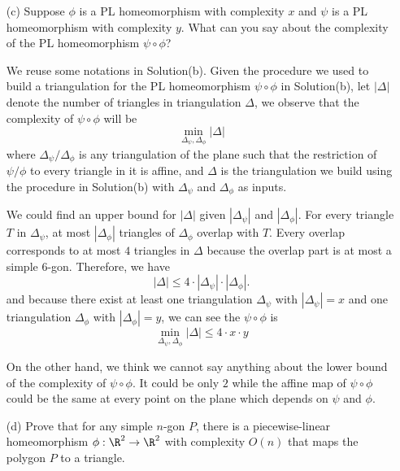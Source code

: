 \documentclass[11pt]{article}
\begin{document}
\begin{enumerate}[(a)]
\begin{solution}
\end{solution}

  \item[(c)]
    Suppose \(\phi\) is a PL homeomorphism with complexity \(x\) and \(\psi\) is a PL
    homeomorphism with complexity \(y\).
    What can you say about the complexity of the PL homeomorphism \(\psi \circ \phi\)?

\begin{solution}
  We reuse some notations in Solution(b).
  Given the procedure we used to build a triangulation for the PL homeomorphism \(\psi\circ \phi\) in Solution(b), let \(|\Delta|\) denote the number of triangles in triangulation \(\Delta\), we observe that the complexity of \(\psi\circ \phi\) will be 
  \[\min_{\Delta_{\psi},\Delta_{\phi}}|\Delta|\]
  where \(\Delta_{\psi}/\Delta_{\phi}\) is any triangulation of the plane such that the restriction of \(\psi/\phi\) to every triangle in it is affine, and \(\Delta\) is the triangulation we build using the procedure in Solution(b) with \(\Delta_{\psi}\) and \(\Delta_{\phi}\) as inputs.

  We could find an upper bound for \(|\Delta|\) given \(|\Delta_{\psi}|\) and \(|\Delta_{\phi}|\).
  For every triangle \(T\) in \(\Delta_{\psi}\), at most \(|\Delta_{\phi}|\) triangles of \(\Delta_{\phi}\) overlap with \(T\). Every overlap corresponds to at most \(4\) triangles in \(\Delta\) because the overlap part is at most a simple \(6\)-gon. Therefore, we have
  \[|\Delta|\le 4\cdot|\Delta_{\psi}|\cdot|\Delta_{\phi}|.\]
  and because there exist at least one triangulation \(\Delta_{\psi}\) with \(|\Delta_{\psi}|=x\) and one triangulation \(\Delta_{\phi}\) with \(|\Delta_{\phi}|=y\), we can see the  \(\psi\circ\phi\) is 
  \[\min_{\Delta_{\psi},\Delta_{\phi}}|\Delta|\le 4\cdot x\cdot y\]

  On the other hand, we think we cannot say anything about the lower bound of the complexity of \(\psi\circ\phi\). It could be only \(2\) while the affine map of \(\psi\circ\phi\) could be the same at every point on the plane which depends on \(\psi\) and \(\phi\).
\end{solution}

  \item[(d)]
    Prove that for any simple \(n\)-gon \(P\), there is a piecewise-linear homeomorphism \(\phi :
    \R^2 \to \R^2\) with complexity \(O(n)\) that maps the polygon \(P\) to a triangle.

\begin{solution}
\end{solution}


\end{enumerate}
\end{document}
